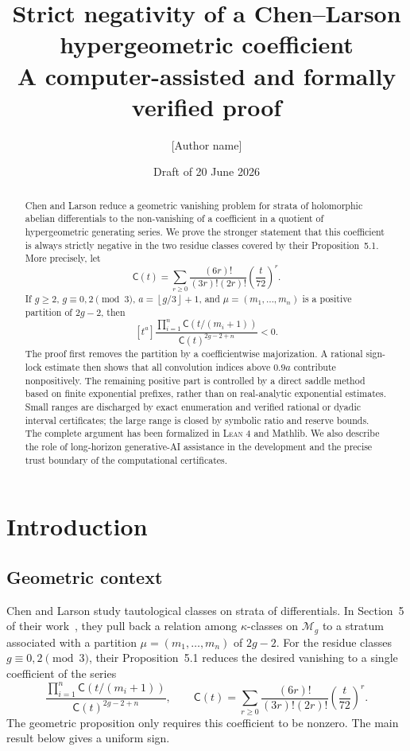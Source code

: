 \documentclass[11pt]{article}
\title{Strict negativity of a Chen--Larson hypergeometric coefficient\\
\large A computer-assisted and formally verified proof}
\author{[Author name]}
\date{Draft of 20 June 2026}
\theoremstyle{definition}
\theoremstyle{remark}
\newcommand{\C}{\mathsf C}
\newcommand{\floor}[1]{\left\lfloor #1\right\rfloor}
\newcommand{\Lean}{\textsc{Lean}}
\begin{document}
\maketitle

\begin{abstract}
Chen and Larson reduce a geometric vanishing problem for strata of
holomorphic abelian differentials to the non-vanishing of a coefficient in a
quotient of hypergeometric generating series.  We prove the stronger statement
that this coefficient is always strictly negative in the two residue classes
covered by their Proposition~5.1.  More precisely, let
\[
  \C(t)=\sum_{r\ge 0}\frac{(6r)!}{(3r)!(2r)!}\left(\frac{t}{72}\right)^r.
\]
If $g\ge2$, $g\equiv0,2\pmod 3$, $a=\floor{g/3}+1$, and
$\mu=(m_1,\ldots,m_n)$ is a positive partition of $2g-2$, then
\[
 [t^a]\frac{\prod_{i=1}^n\C(t/(m_i+1))}
                   {\C(t)^{2g-2+n}}<0.
\]
The proof first removes the partition by a coefficientwise majorization.  A
rational sign-lock estimate then shows that all convolution indices above
$0.9a$ contribute nonpositively.  The remaining positive part is controlled
by a direct saddle method based on finite exponential prefixes, rather than
on real-analytic exponential estimates.  Small ranges are discharged by
exact enumeration and verified rational or dyadic interval certificates; the
large range is closed by symbolic ratio and reserve bounds.  The complete
argument has been formalized in \Lean{} 4 and Mathlib.  We also describe the
role of long-horizon generative-AI assistance in the development and the
precise trust boundary of the computational certificates.
\end{abstract}

\tableofcontents

\section{Introduction}

\subsection{Geometric context}

Chen and Larson study tautological classes on strata of differentials.  In
Section~5 of their work~\cite{ChenLarson}, they pull back a relation among
$\kappa$-classes on $\mathcal M_g$ to a stratum associated with a partition
$\mu=(m_1,\ldots,m_n)$ of $2g-2$.  For the residue classes
$g\equiv0,2\pmod 3$, their Proposition~5.1 reduces the desired vanishing to a
single coefficient of the series
\begin{equation}\label{eq:CL-series-intro}
  \frac{\prod_{i=1}^n \C(t/(m_i+1))}{\C(t)^{2g-2+n}},
  \qquad
  \C(t)=\sum_{r\ge0}\frac{(6r)!}{(3r)!(2r)!}
                   \left(\frac{t}{72}\right)^r.
\end{equation}
The geometric proposition only requires this coefficient to be nonzero.  The
main result below gives a uniform sign.
\end{document}
